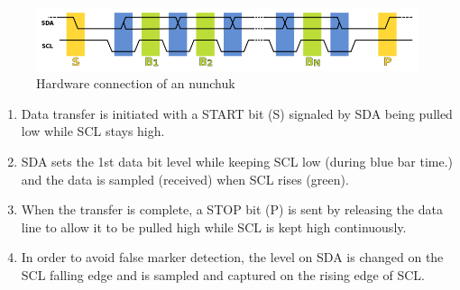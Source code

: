 \begin{figure}[h]
\centering
\includegraphics[scale=0.4]{Figures/I2C}
\caption{Hardware connection of an nunchuk}
\label{fig:i2c}
\end{figure}


\begin{enumerate}
\item Data transfer is initiated with a START bit (S) signaled by SDA being
pulled low while SCL stays high.
\item SDA sets the 1st data bit level while keeping SCL low (during blue bar
time.) and the data is sampled (received) when SCL rises (green).
\item When the transfer is complete, a STOP bit (P) is sent by releasing the
data line to allow it to be pulled high while SCL is kept high continuously.
\item In order to avoid false marker detection, the level on SDA is changed on
the SCL falling edge and is sampled and captured on the rising edge of SCL.
\end{enumerate}


